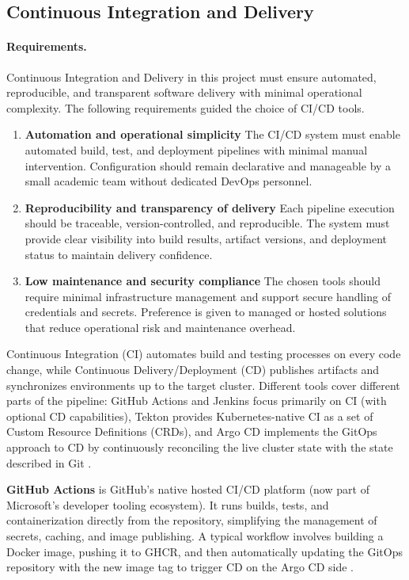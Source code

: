 \subsection{Continuous Integration and Delivery}

\paragraph{Requirements.}
Continuous Integration and Delivery in this project must ensure automated, reproducible, and transparent software delivery with minimal operational complexity. The following requirements guided the choice of CI/CD tools.

\begin{enumerate}
    \item \textbf{Automation and operational simplicity}  
    The CI/CD system must enable automated build, test, and deployment pipelines with minimal manual intervention. Configuration should remain declarative and manageable by a small academic team without dedicated DevOps personnel.

    \item \textbf{Reproducibility and transparency of delivery}  
    Each pipeline execution should be traceable, version-controlled, and reproducible. The system must provide clear visibility into build results, artifact versions, and deployment status to maintain delivery confidence.

    \item \textbf{Low maintenance and security compliance}  
    The chosen tools should require minimal infrastructure management and support secure handling of credentials and secrets. Preference is given to managed or hosted solutions that reduce operational risk and maintenance overhead.
\end{enumerate}

Continuous Integration (CI) automates build and testing processes on every code change, while Continuous Delivery/Deployment (CD) publishes artifacts and synchronizes environments up to the target cluster. Different tools cover different parts of the pipeline: GitHub Actions and Jenkins focus primarily on CI (with optional CD capabilities), Tekton provides Kubernetes-native CI as a set of Custom Resource Definitions (CRDs), and Argo CD implements the GitOps approach to CD by continuously reconciling the live cluster state with the state described in Git \parencite{CICDTool40:online,GitHubAc85:online,ArgoCDDe97:online}.

\textbf{GitHub Actions} is GitHub’s native hosted CI/CD platform (now part of Microsoft’s developer tooling ecosystem). It runs builds, tests, and containerization directly from the repository, simplifying the management of secrets, caching, and image publishing. A typical workflow involves building a Docker image, pushing it to GHCR, and then automatically updating the GitOps repository with the new image tag to trigger CD on the Argo CD side \parencite{GitHubAc85:online,CICDTool40:online,ArgoCDGi52:online}.

